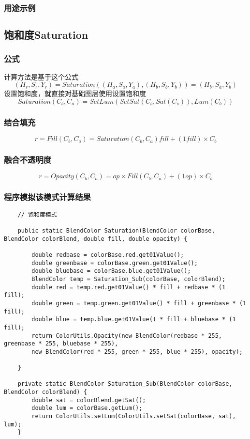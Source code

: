 \subsubsection{ 用途示例}

\subsection{ 饱和度Saturation}

\subsubsection{ 公式}

计算方法是基于这个公式
$$(H_r,S_r,Y_r)= Saturation((H_a,S_a,Y_a),(H_b,S_b,Y_b))=(H_b,S_a,Y_b)$$
设置饱和度，就直接对基础图层使用设置饱和度
$$Saturation(C_b,C_a)=SetLum(SetSat(C_b,Sat(C_s)),Lum(C_b))$$

\subsubsection{ 结合填充}

$$r=Fill(C_b,C_a)= Saturation(C_b,C_a) fill + (1fill)\times C_b$$

\subsubsection{ 融合不透明度}

$$r=Opacity(C_b,C_a)=op\times Fill(C_b,C_a)+(1op)\times C_b$$

\subsubsection{ 程序模拟该模式计算结果}

\begin{lstlisting}
	// 饱和度模式
	
	public static BlendColor Saturation(BlendColor colorBase, BlendColor colorBlend, double fill, double opacity) {
		
		double redbase = colorBase.red.get01Value();
		double greenbase = colorBase.green.get01Value();
		double bluebase = colorBase.blue.get01Value();
		BlendColor temp = Saturation_Sub(colorBase, colorBlend);
		double red = temp.red.get01Value() * fill + redbase * (1  fill);
		double green = temp.green.get01Value() * fill + greenbase * (1  fill);
		double blue = temp.blue.get01Value() * fill + bluebase * (1  fill);
		return ColorUtils.Opacity(new BlendColor(redbase * 255, greenbase * 255, bluebase * 255),
		new BlendColor(red * 255, green * 255, blue * 255), opacity);
		
	}
	
	private static BlendColor Saturation_Sub(BlendColor colorBase, BlendColor colorBlend) {
		double sat = colorBlend.getSat();
		double lum = colorBase.getLum();
		return ColorUtils.setLum(ColorUtils.setSat(colorBase, sat), lum);
	}
\end{lstlisting}



